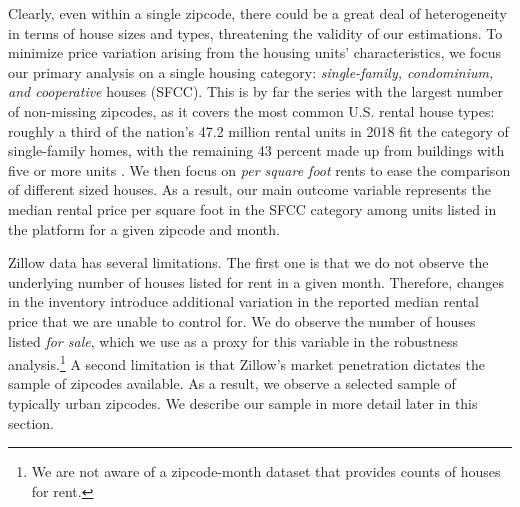 Clearly, even within a single zipcode, there could be a great deal of heterogeneity in 
terms of house sizes and types, threatening the validity of our estimations.
To minimize price variation arising from the housing units' characteristics, we focus 
our primary analysis on a single housing category: \textit{single-family, condominium, and 
cooperative} houses (SFCC). This is by far the series with the largest number of 
non-missing zipcodes, as it covers the most common U.S. rental house types: 
roughly a third of the nation's 47.2 million rental units in 2018 fit the category of 
single-family homes, with the remaining 43 percent made up from buildings with five or more 
units \parencite{fernald2020americas}. We then focus on \textit{per square foot} rents 
to ease the comparison of different sized houses. As a result, our main outcome 
variable represents the median rental price per square foot in the SFCC category 
among units listed in the platform for a given zipcode and month. 

Zillow data has several limitations. The first one is that we do not observe the 
underlying number of houses listed for rent in a given month. Therefore, changes in the 
inventory introduce additional variation in the reported median rental price that we 
are unable to control for. We do observe the number of houses listed \textit{for sale}, 
which we use as a proxy for this variable in the robustness analysis.\footnote{We are not 
	aware of a zipcode-month dataset that provides counts of houses for rent.}
A second limitation is that Zillow's market penetration dictates the sample of zipcodes available. 
As a result, we observe a selected sample of typically urban zipcodes. We describe 
our sample in more detail later in this section.

